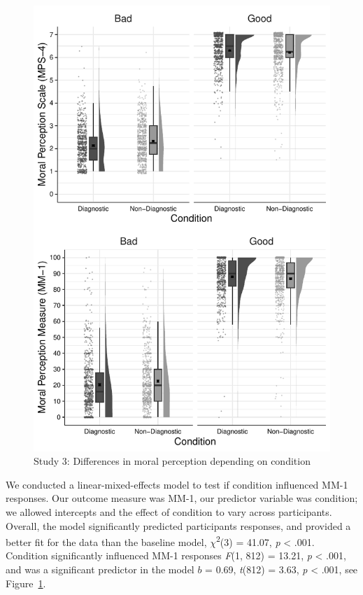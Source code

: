 \documentclass[
  man,floatsintext]{apa6}
\begin{document}
\begin{figure}
\centering
\includegraphics{moral_dilution_in_chunks_files/figure-latex/S3bothconditionplot-1.pdf}
\caption{\label{fig:S3bothconditionplot}Study 3: Differences in moral perception depending on condition}
\end{figure}

We conducted a linear-mixed-effects model to test if condition influenced MM-1 responses. Our outcome measure was MM-1, our predictor variable was condition; we allowed intercepts and the effect of condition to vary across participants. Overall, the model significantly predicted participants responses, and provided a better fit for the data than the baseline model, \(\chi\)\textsuperscript{2}(3) = 41.07, \emph{p} \textless{} .001. Condition significantly influenced MM-1 responses \emph{F}(1, 812) = 13.21, \emph{p} \textless{} .001, and was a significant predictor in the model \(b\) = 0.69, \emph{t}(812) = 3.63, \emph{p} \textless{} .001, see Figure~\ref{fig:S3bothconditionplot}.
\end{document}
